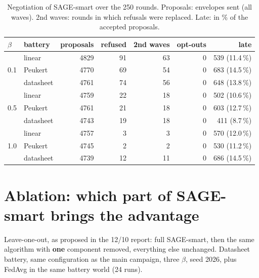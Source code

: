 \documentclass[11pt,a4paper]{article}
\begin{document}
\begin{table}[H]
\centering
\caption{Negotiation of SAGE-smart over the 250 rounds. Proposals: envelopes
sent (all waves). 2nd waves: rounds in which refusals were replaced. Late: in
\% of the accepted proposals.}
\label{tab:negotiation}
\begin{tabular}{llrrrrr}
\toprule
$\beta$ & battery & proposals & refused & 2nd waves & opt-outs & late \\
\midrule
\multirow{3}{*}{0.1} & linear    & 4829 & 91 & 63 & 0 & 539 (11.4\,\%) \\
                     & Peukert   & 4770 & 69 & 54 & 0 & 683 (14.5\,\%) \\
                     & datasheet & 4761 & 74 & 56 & 0 & 648 (13.8\,\%) \\
\midrule
\multirow{3}{*}{0.5} & linear    & 4759 & 22 & 18 & 0 & 502 (10.6\,\%) \\
                     & Peukert   & 4761 & 21 & 18 & 0 & 603 (12.7\,\%) \\
                     & datasheet & 4743 & 19 & 18 & 0 & 411 (8.7\,\%) \\
\midrule
\multirow{3}{*}{1.0} & linear    & 4757 &  3 &  3 & 0 & 570 (12.0\,\%) \\
                     & Peukert   & 4745 &  2 &  2 & 0 & 530 (11.2\,\%) \\
                     & datasheet & 4739 & 12 & 11 & 0 & 686 (14.5\,\%) \\
\bottomrule
\end{tabular}
\end{table}

\section{Ablation: which part of SAGE-smart brings the advantage}
\label{sec:ablation}

Leave-one-out, as proposed in the 12/10 report: full SAGE-smart, then the same
algorithm with \textbf{one} component removed, everything else unchanged.
Datasheet battery, same configuration as the main campaign, three $\beta$, seed
2026, plus FedAvg in the same battery world (24 runs).
\end{document}
